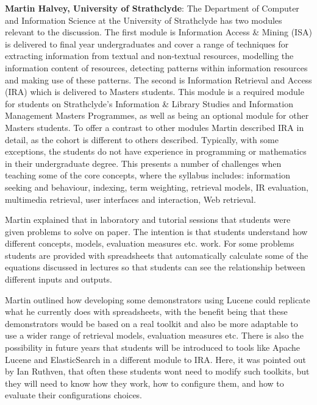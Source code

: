 {\bf Martin Halvey, University of Strathclyde}: The Department of Computer and Information Science at the University of Strathclyde has two modules relevant to the discussion. The first module is Information Access \& Mining (ISA) is delivered to final year undergraduates and cover a range of techniques for extracting information from textual and non-textual resources, modelling the information content of resources, detecting patterns within information resources and making use of these patterns. The second is Information Retrieval and Access (IRA) which is delivered to Masters students. This module is a required module for students on Strathclyde's Information \& Library Studies and Information Management Masters Programmes, as well as being an optional module for other Masters students. To offer a contrast to other modules Martin described IRA in detail, as the cohort is different to others described. Typically, with some exceptions, the students do not have experience in programming or mathematics in their undergraduate degree. This presents a number of challenges when teaching some of the core concepts, where the syllabus includes:
information seeking and behaviour,
indexing,
term weighting,
retrieval models,
IR evaluation,
multimedia retrieval,
user interfaces and interaction,
Web retrieval. 

Martin explained that in laboratory and tutorial sessions that students were given problems to solve on paper. The intention is that students understand how different concepts, models, evaluation measures etc. work. For some problems students are provided with spreadsheets that automatically calculate some of the equations discussed in lectures so that students can see the relationship between different inputs and outputs. 

Martin outlined how developing some demonstrators using Lucene could replicate what he currently does with spreadsheets, with the benefit being that these demonstrators would be based on a real toolkit and also be more adaptable to use a wider range of retrieval models, evaluation measures etc. There is also the possibility in future years that students will be introduced to tools like Apache Lucene and ElasticSearch in a different module to IRA. Here, it was pointed out by Ian Ruthven, that often these students wont need to modify such toolkits, but they will need to know how they work, how to configure them, and how to evaluate their configurations choices.\\

